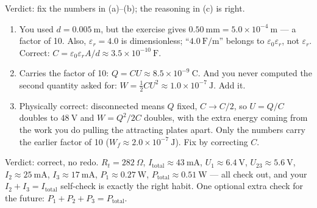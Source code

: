 \begin{feedback}[\cref{ex:em-3}]
Verdict: fix the numbers in (a)--(b); the reasoning in (c) is right.
\begin{enumerate}[label=(\alph*)]
  \item You used $d = 0.005\ \mathrm{m}$, but the exercise gives $0.50\ \mathrm{mm} = 5.0\times 10^{-4}\ \mathrm{m}$ --- a factor of 10. Also, $\varepsilon_r = 4.0$ is dimensionless; ``$4.0\ \mathrm{F/m}$'' belongs to $\varepsilon_0\varepsilon_r$, not $\varepsilon_r$. Correct: $C = \varepsilon_0\varepsilon_r A/d \approx 3.5\times 10^{-10}\ \mathrm{F}$.
  \item Carries the factor of 10: $Q = CU \approx 8.5\times 10^{-9}\ \mathrm{C}$. And you never computed the second quantity asked for: $W = \tfrac{1}{2}CU^2 \approx 1.0\times 10^{-7}\ \mathrm{J}$. Add it.
  \item Physically correct: disconnected means $Q$ fixed, $C \to C/2$, so $U = Q/C$ doubles to $48\ \mathrm{V}$ and $W = Q^2/2C$ doubles, with the extra energy coming from the work you do pulling the attracting plates apart. Only the numbers carry the earlier factor of 10 ($W_f \approx 2.0\times 10^{-7}\ \mathrm{J}$). Fix by correcting $C$.
\end{enumerate}
\end{feedback}

\begin{feedback}[\cref{ex:em-4}]
Verdict: correct, no redo. $R_t = 282\ \Omega$, $I_\text{total} \approx 43\ \mathrm{mA}$, $U_1 \approx 6.4\ \mathrm{V}$, $U_{23} \approx 5.6\ \mathrm{V}$, $I_2 \approx 25\ \mathrm{mA}$, $I_3 \approx 17\ \mathrm{mA}$, $P_1 \approx 0.27\ \mathrm{W}$, $P_\text{total} \approx 0.51\ \mathrm{W}$ --- all check out, and your $I_2 + I_3 = I_\text{total}$ self-check is exactly the right habit. One optional extra check for the future: $P_1 + P_2 + P_3 = P_\text{total}$.
\end{feedback}

